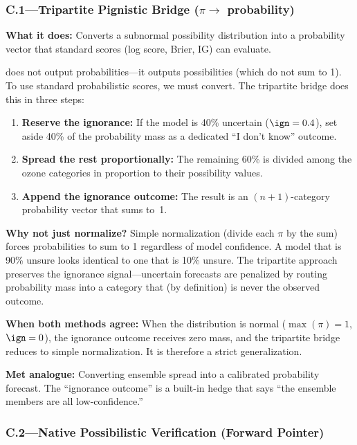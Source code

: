\subsubsection{C.1---Tripartite Pignistic Bridge ($\pi \to$ probability)}\label{sec:plain_c1}

\textbf{What it does:} Converts a subnormal possibility distribution into a probability vector that standard scores (log score, Brier, IG) can evaluate.

\clyfar{} does not output probabilities---it outputs possibilities (which do not sum to 1). To use standard probabilistic scores, we must convert. The tripartite bridge does this in three steps:

\begin{enumerate}[leftmargin=2em]
\item \textbf{Reserve the ignorance:} If the model is 40\% uncertain ($\ign = 0.4$), set aside 40\% of the probability mass as a dedicated ``I don't know'' outcome.
\item \textbf{Spread the rest proportionally:} The remaining 60\% is divided among the ozone categories in proportion to their possibility values.
\item \textbf{Append the ignorance outcome:} The result is an $(n{+}1)$-category probability vector that sums to~1.
\end{enumerate}

\textbf{Why not just normalize?} Simple normalization (divide each $\pi$ by the sum) forces probabilities to sum to 1 regardless of model confidence. A model that is 90\% unsure looks identical to one that is 10\% unsure. The tripartite approach preserves the ignorance signal---uncertain forecasts are penalized by routing probability mass into a category that (by definition) is never the observed outcome.

\textbf{When both methods agree:} When the distribution is normal ($\max(\pi) = 1$, $\ign = 0$), the ignorance outcome receives zero mass, and the tripartite bridge reduces to simple normalization. It is therefore a strict generalization.

\textbf{Met analogue:} Converting ensemble spread into a calibrated probability forecast. The ``ignorance outcome'' is a built-in hedge that says ``the ensemble members are all low-confidence.''

\subsubsection{C.2---Native Possibilistic Verification (Forward Pointer)}\label{sec:plain_c2}

